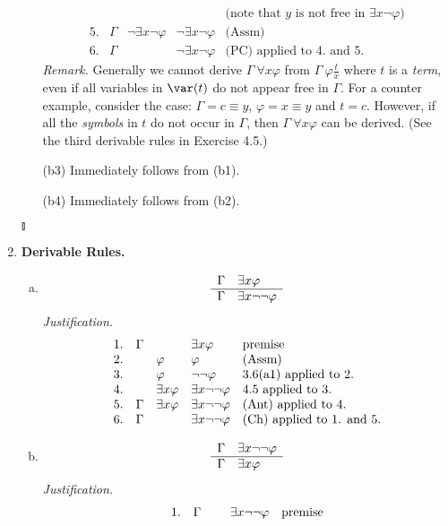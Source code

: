 \begin{enumerate}[1.]
\begin{itemize}
\[\begin{array}{lllll}
\, & \, & \, & \, & \mbox{(note that $y$ is not free in $\exists x \neg \varphi$)} \\
5. & \Gamma & \neg \exists x \neg \varphi & \neg \exists x \neg \varphi & \mbox{(Assm)} \\
6. & \Gamma & \, & \neg \exists x \neg \varphi & \mbox{(PC) applied to 4. and 5.}
\end{array}
\]
\textit{Remark.} Generally we cannot derive $\Gamma \ \forall x \varphi$ from $\Gamma \ \varphi\frac{t}{x}$ where $t$ is a \emph{term}, even if all variables in $\var(t)$ do not appear free in $\Gamma$. For a counter example, consider the case: $\Gamma = c \equiv y$, $\varphi = x \equiv y$ and $t = c$. However, if all the \emph{symbols} in $t$ do not occur in $\Gamma$, then $\Gamma \ \forall x \varphi$ can be derived. (See the third derivable rules in Exercise 4.5.)
\item[(b3)] Immediately follows from (b1).
\item[(b4)] Immediately follows from (b2).
\end{itemize} \begin{flushright}$\talloblong$\end{flushright}
%
\item \textbf{Derivable Rules.}
\begin{enumerate}[(a)]
\item
\[
\begin{array}{ll}
\Gamma & \exists x \varphi \cr\hline
\Gamma & \exists x \neg\neg\varphi
\end{array}
\]
\textit{Justification.}
\[
\begin{array}{lllll}
1. & \Gamma & \ & \exists x \varphi & \mbox{premise} \cr
2. & \ & \varphi & \varphi & \mbox{(Assm)} \cr
3. & \ & \varphi & \neg\neg\varphi & \mbox{3.6(a1) applied to 2.} \cr
4. & \ & \exists x \varphi & \exists x \neg\neg\varphi & \mbox{4.5 applied to 3.} \cr
5. & \Gamma & \exists x \varphi & \exists x \neg\neg\varphi & \mbox{(Ant) applied to 4.} \cr
6. & \Gamma & \ & \exists x \neg\neg\varphi & \mbox{(Ch) applied to 1. and 5.}
\end{array}
\]
\item
\[
\begin{array}{ll}
\Gamma & \exists x \neg\neg\varphi \cr\hline
\Gamma & \exists x \varphi
\end{array}
\]
\textit{Justification.}
\[
\begin{array}{lllll}
1. & \Gamma & \ & \exists x \neg\neg\varphi & \mbox{premise} \cr

\end{array}\]
\end{enumerate}
\end{enumerate}
